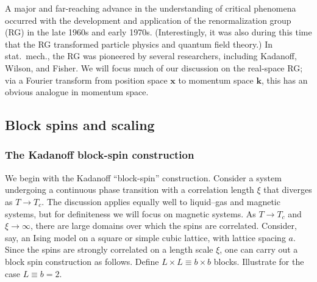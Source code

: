 
A major and far-reaching advance in the understanding of critical phenomena occurred with the
development and application of the renormalization group (RG) in the late 1960s and early 1970s.
(Interestingly, it was also during this time that the RG transformed particle physics and quantum
field theory.) In stat.\ mech., the RG was pioneered by several researchers, including Kadanoff,
Wilson, and Fisher. We will focus much of our discussion on the real-space RG; via a Fourier
transform from position space $\mathbf{x}$ to momentum space $\mathbf{k}$, this has an obvious
analogue in momentum space.

\subsection{Block spins and scaling}
\subsubsection*{The Kadanoff block-spin construction}

We begin with the Kadanoff ``block-spin'' construction. Consider a system undergoing a continuous
phase transition with a correlation length $\xi$ that diverges as $T\to T_c$. The discussion applies
equally well to liquid--gas and magnetic systems, but for definiteness we will focus on magnetic
systems. As $T\to T_c$ and $\xi\to\infty$, there are large domains over which the spins are
correlated. Consider, say, an Ising model on a square or simple cubic lattice, with lattice spacing
$a$. Since the spins are strongly correlated on a length scale $\xi$, one can carry out a block spin
construction as follows. Define $L\times L\equiv b\times b$ blocks. Illustrate for the case
$L\equiv b = 2$.

